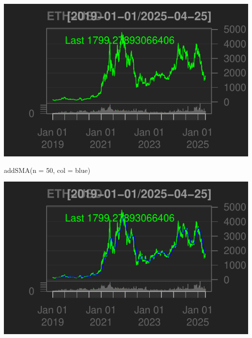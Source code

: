 \documentclass[]{tufte-handout}
\newenvironment{Shaded}{}{}
\newcommand{\AttributeTok}[1]{\textcolor[rgb]{0.49,0.56,0.16}{#1}}
\newcommand{\DecValTok}[1]{\textcolor[rgb]{0.25,0.63,0.44}{#1}}
\newcommand{\FunctionTok}[1]{\textcolor[rgb]{0.02,0.16,0.49}{#1}}
\newcommand{\NormalTok}[1]{#1}
\newcommand{\StringTok}[1]{\textcolor[rgb]{0.25,0.44,0.63}{#1}}
\begin{document}
\includegraphics{cripto_update_files/figure-latex/unnamed-chunk-6-1}

\begin{Shaded}
\begin{Highlighting}[]
\FunctionTok{addSMA}\NormalTok{(}\AttributeTok{n =} \DecValTok{50}\NormalTok{, }\AttributeTok{col =} \StringTok{\textquotesingle{}blue\textquotesingle{}}\NormalTok{)}
\end{Highlighting}
\end{Shaded}

\includegraphics{cripto_update_files/figure-latex/unnamed-chunk-6-2}
\end{document}
